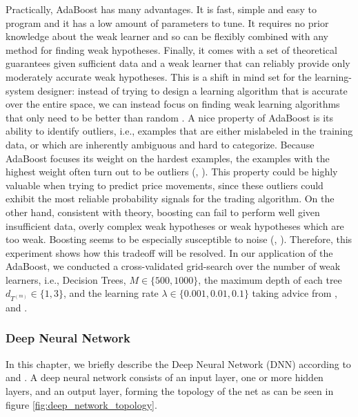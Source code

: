 Practically, AdaBoost has many advantages. It is fast, simple and easy to program 
and it has a low amount of parameters to tune. It requires no prior knowledge about
the weak learner and so can be flexibly combined with any method for finding weak hypotheses.
Finally, it comes with a set of theoretical guarantees given sufficient data and a weak learner that
can reliably provide only moderately accurate weak hypotheses. This is a shift in mind set for the
learning-system designer: instead of trying to design a learning algorithm that is accurate over the
entire space, we can instead focus on finding weak learning algorithms that only need to be better
than random \cite{schapire1999boostingIntro}. 
A nice property of AdaBoost is its ability to identify outliers, i.e., examples that are either
mislabeled in the training data, or which are inherently ambiguous and hard to categorize. Because
AdaBoost focuses its weight on the hardest examples, the examples with the highest weight often
turn out to be outliers (\cite{schapire1996boostingExperiments}, \cite{schapire1999boostingIntro}).
This property could be highly valuable when trying to predict price movements, 
since these outliers could exhibit the most reliable probability signals for the trading algorithm.
On the other hand, consistent with theory,
boosting can fail to perform well given insufficient data, overly complex weak hypotheses or weak
hypotheses which are too weak. 
Boosting seems to be especially susceptible to noise (\cite{schapire1999boostingIntro}, \cite{dietterich2000ensembleComparison}).
Therefore, this experiment shows how this tradeoff will be resolved. 
In our application of the AdaBoost, we conducted a cross-validated grid-search over the number of weak learners, i.e., Decision Trees,
$M \in \{500, 1000\}$,
the maximum depth of each tree $ d_{ T^{ (m) } } \in \{1, 3\} $,
and the learning rate $ \lambda \in \{ 0.001, 0.01, 0.1 \}$
taking advice from \cite{krauss2016arbitrageSandP}, \cite{hastie2009statisticalLearning} and \cite{friedman2002gradientBoosting}.


\subsubsection{Deep Neural Network}
In this chapter, we briefly describe the Deep Neural Network (DNN) according to \cite{dixon2015annMarketPrediction} and \cite{krauss2016arbitrageSandP}. 
A deep neural network consists of an input layer, one or more hidden layers, and an output layer,
forming the topology of the net as can be seen in figure \ref{fig:deep_network_topology}. 


